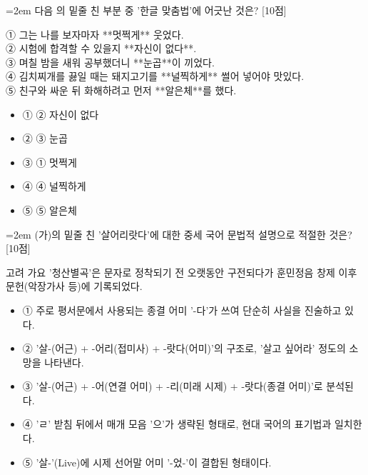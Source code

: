 \documentclass[10pt,a4paper]{article}
\newcommand{\qnum}[1]{%
  \tikz[baseline=(num.base)]{%
    \node[circle, fill=numCircle, text=white, inner sep=0pt,
          minimum size=18pt, font=\small\bfseries] (num) {#1};%
  }%
}
\newcommand{\pts}[1]{%
  \hfill\textcolor{ptsBadge}{[#1점]}%
}
\begin{document}
\vspace{4mm}
\begin{minipage}{\columnwidth}
{\hangindent=2em
\qnum{20}\enspace 다음 의 밑줄 친 부분 중 '한글 맞춤법'에 어긋난 것은? \pts{10}
\par}

\vspace{3mm}
\begin{tcolorbox}[bogi]
① 그는 나를 보자마자 **멋쩍게** 웃었다. \\{}
② 시험에 합격할 수 있을지 **자신이 없다**.  \\{}
③ 며칠 밤을 새워 공부했더니 **눈곱**이 끼었다. \\{}
④ 김치찌개를 끓일 때는 돼지고기를 **널찍하게** 썰어 넣어야 맛있다. \\{}
⑤ 친구와 싸운 뒤 화해하려고 먼저 **알은체**를 했다.
\end{tcolorbox}
\vspace{3mm}
\begin{itemize}[leftmargin=2.5em, labelsep=0.3em, label={}, itemsep=4pt, parsep=1pt, topsep=0pt]
  \item ① ② 자신이 없다
  \item ② ③ 눈곱
  \item ③ ① 멋쩍게
  \item ④ ④ 널찍하게
  \item ⑤ ⑤ 알은체
\end{itemize}
\end{minipage}
\vspace{4mm}

\vspace{4mm}
\begin{minipage}{\columnwidth}
{\hangindent=2em
\qnum{21}\enspace (가)의 밑줄 친 '살어리랏다'에 대한 중세 국어 문법적 설명으로 적절한 것은? \pts{10}
\par}

\vspace{3mm}
\begin{tcolorbox}[bogi]
고려 가요 '청산별곡'은 문자로 정착되기 전 오랫동안 구전되다가 훈민정음 창제 이후 문헌(악장가사 등)에 기록되었다.
\end{tcolorbox}
\vspace{3mm}
\begin{itemize}[leftmargin=2.5em, labelsep=0.3em, label={}, itemsep=4pt, parsep=1pt, topsep=0pt]
  \item ① 주로 평서문에서 사용되는 종결 어미 '-다'가 쓰여 단순히 사실을 진술하고 있다.
  \item ② '살-(어근) + -어리(접미사) + -랏다(어미)'의 구조로, '살고 싶어라' 정도의 소망을 나타낸다.
  \item ③ '살-(어근) + -어(연결 어미) + -리(미래 시제) + -랏다(종결 어미)'로 분석된다.
  \item ④ 'ㄹ' 받침 뒤에서 매개 모음 '으'가 생략된 형태로, 현대 국어의 표기법과 일치한다.
  \item ⑤ '살-'(Live)에 시제 선어말 어미 '-었-'이 결합된 형태이다.
\end{itemize}
\end{minipage}
\vspace{4mm}
\end{document}

